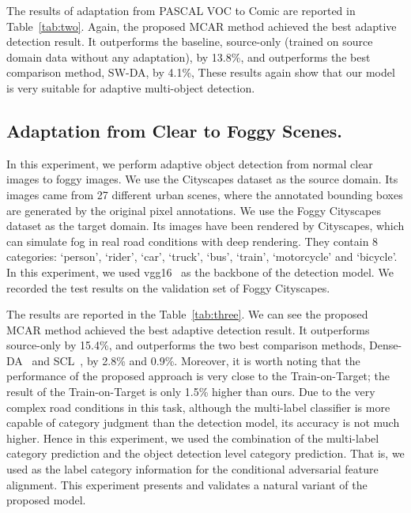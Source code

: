 \documentclass[runningheads]{llncs}
\begin{document}
The results of adaptation from PASCAL VOC to Comic 
are reported in Table~\ref{tab:two}. 
Again, the proposed MCAR method achieved the best adaptive detection result.
It outperforms the baseline, source-only (trained on source domain data without any adaptation), by 13.8{\%}, 
and outperforms the best comparison method, SW-DA, by 4.1\%,
These results again show that our model is very suitable for adaptive multi-object detection.


\subsection{Adaptation from Clear to Foggy Scenes.}
In this experiment, we perform adaptive object detection from normal clear images to foggy images.
We use the Cityscapes dataset as the source domain. Its images came from 27 different urban scenes, 
where the annotated bounding boxes are generated by the original pixel annotations.
We use the Foggy Cityscapes dataset as the target domain. 
Its images have been rendered by Cityscapes, which can simulate fog in real road conditions with deep rendering. 
They contain 8 categories: `person', `rider', `car', `truck', `bus', `train', `motorcycle' and `bicycle'. 
In this experiment, we used vgg16~\cite{simonyan2014very} as the backbone of the detection model.
We recorded the test results on the validation set of Foggy Cityscapes.


The results are reported in the Table~\ref{tab:three}. 
We can see the proposed MCAR method achieved the best adaptive detection result.
It outperforms source-only by 15.4{\%}, and outperforms the two best comparison methods, 
Dense-DA~\cite{xie2019multi} and SCL~\cite{shen2019scl}, 
by 2.8\% and 0.9\%.
Moreover, it is worth noting that the performance of the proposed approach is very close to the Train-on-Target; 
the result of the Train-on-Target is only 1.5\% higher than ours.
Due to the very complex road conditions in this task, 
although the multi-label classifier is more capable of category judgment than the detection model, 
its accuracy is not much higher.
Hence in this experiment, we used the combination of the multi-label category prediction
and the object detection level category prediction. 
That is, we used  as the label category information
for the conditional adversarial feature alignment.
This experiment presents and validates a natural variant of the proposed model.
\end{document}
